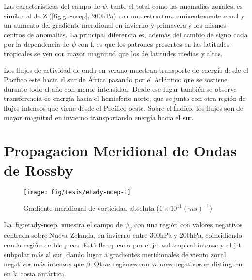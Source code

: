 \documentclass[spanish,a4paper,12pt]{book}
\begin{document}
Las características del campo de \(\psi\), tanto el total como las
anomalías zonales, es similar al de Z (\autoref{fig:gh-ncep}, 200hPa)
con una estructura eminentemente zonal y un aumento del gradiente
meridional en invierno y primavera y los mismos centros de anomalías. La
principal diferencia es, además del cambio de signo dada por la
dependencia de \(\psi\) con f, es que los patrones presentes en las
latitudes tropicales se ven con mayor magnitud que los de latitudes
medias y altas.

Los flujos de actividad de onda en verano muestran transporte de energía
desde el Pacífico este hacia el sur de África pasando por el Atlántico
que se sostiene durante todo el año con menor intensidad. Desde ese
lugar también se observa transferencia de energía hacia el hemisferio
norte, que se junta con otra región de flujos intensos que viene desde
el Pacífico oeste. Sobre el Índico, los flujos son de mayor magnitud en
invierno transportando energía hacia el sur.

\section{Propagacion Meridional de Ondas de
Rossby}\label{propagacion-meridional-de-ondas-de-rossby}

\begin{landscape}\begin{figure}

{\centering \texttt{[image: fig/tesis/etady-ncep-1]} 

}

\caption{Gradiente meridional de vorticidad absoluta ($1\times10^11(ms)^{-1}$)}\label{fig:etady-ncep}
\end{figure}
\end{landscape}

La \autoref{fig:etady-ncep} muestra el campo de \(\psi_y\) con una
región con valores negativos centrada sobre Nueva Zelanda, en invierno
entre 300hPa y 200hPa, coincidiendo con la región de bloqueos. Está
flanqueada por el jet subtropical intenso y el jet subpolar más al sur,
dando lugar a gradientes meridionales de viento zonal negativos más
intensos que \(\beta\). Otras regiones con valores negativos se
distinguen en la costa antártica.
\end{document}
